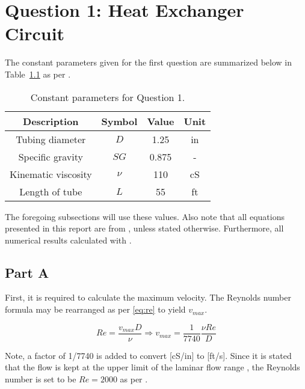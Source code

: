 \chapter{Question 1: Heat Exchanger Circuit}
\label{chap:q1}

The constant parameters given for the first question are summarized below in Table~\ref{tab:q1param} as per \cite{assign}.

\begin{table}[H]
  \centering
  \caption{Constant parameters for Question 1.}
    \begin{tabular}{cccc}
	\toprule    
    \textbf{Description} & \textbf{Symbol} & \textbf{Value } & \textbf{Unit} \\
    \midrule
    Tubing diameter 		& $D$     & 1.25  & in \\
    Specific gravity 		& $SG$    & 0.875  & - \\
    Kinematic viscosity 	& $\nu$    & 110   & cS \\
    Length of tube 			& $L$     & 55    & ft \\
    \bottomrule
    \end{tabular}
  \label{tab:q1param}
\end{table}

The foregoing subsections will use these values. Also note that all equations presented in this report are from \cite{formula}, unless stated otherwise. Furthermore, all numerical results calculated with \cite{excel}.

\section{Part A}
\label{sect:1a}

First, it is required to calculate the maximum velocity. The Reynolds number formula may be rearranged as per \ref{eq:re} to yield $v_{max}$.

\begin{equation}
	\label{eq:re}
	Re = \frac{v_{max}D}{\nu} \Rightarrow v_{max} = \frac{1}{7740} \frac{\nu Re}{D}
\end{equation}

Note, a factor of 1/7740 is added to convert [cS/in] to [ft/s]. Since it is stated that the flow is kept at the upper limit of the laminar flow range \cite{assign}, the Reynolds number is set to be $Re=2000$ as per \cite{fluids}.\\

